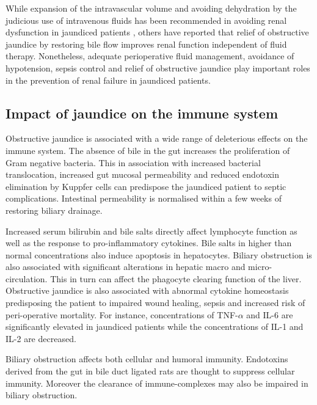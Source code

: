 While expansion of the intravascular volume and avoiding dehydration by the judicious use of intravenous fluids has been recommended in avoiding renal dysfunction in jaundiced patients \parencite{parks_prospective_1994}, others have reported that relief of obstructive jaundice by restoring bile flow improves renal function independent of fluid therapy.\parencite{padillo_randomized_2005} Nonetheless, adequate perioperative fluid management, avoidance of hypotension, sepsis control and relief of obstructive jaundice play important roles in the prevention of renal failure in jaundiced patients.

\subsection{Impact of jaundice on the immune system}

Obstructive jaundice is associated with a wide range of deleterious effects on the immune system. The absence of bile in the gut increases the proliferation of Gram negative bacteria. This in association with increased bacterial translocation, increased gut mucosal permeability and reduced endotoxin elimination by Kuppfer cells can predispose the jaundiced patient to septic complications. Intestinal permeability is normalised within a few weeks of restoring biliary drainage.

Increased serum bilirubin and bile salts directly affect lymphocyte function as well as the response to pro-inflammatory cytokines. Bile salts in higher than normal concentrations also induce apoptosis in hepatocytes. Biliary obstruction is also associated with significant alterations in hepatic macro and micro-circulation. This in turn can affect the phagocyte clearing function of the liver. Obstructive jaundice is also associated with abnormal cytokine homeostasis predisposing the patient to impaired wound healing, sepsis and increased risk of peri-operative mortality.  For instance, concentrations of TNF-$\alpha$ and IL-6 are significantly elevated in jaundiced patients while the concentrations of IL-1 and IL-2 are decreased. 

Biliary obstruction affects both cellular and humoral immunity. Endotoxins derived from the gut in bile duct ligated rats are thought to suppress cellular immunity. Moreover the clearance of immune-complexes may also be impaired in biliary obstruction.


